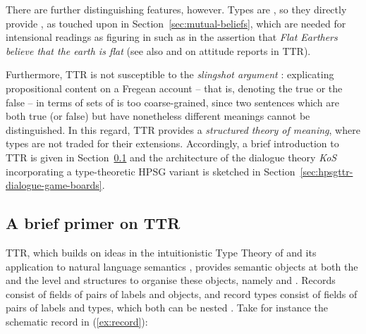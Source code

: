 \documentclass[output=paper
 	        ,biblatex
                ,babelshorthands
                ,newtxmath
                ,draftmode
                ,colorlinks, citecolor=brown
]{langscibook}
\begin{document}
There are further distinguishing features, however.
%
Types are , so they directly provide , as touched upon in Section~\ref{sec:mutual-beliefs}, which are needed for intensional readings as figuring in  such as in the assertion that \textit{Flat Earthers believe that the earth is flat} (see also \citealt{Cooper:2005:b} and \citealt{Cooper:ms} on attitude reports in TTR).


Furthermore, TTR is not susceptible to the \emph{slingshot argument}  \citep[--26]{Barwise:Perry:1983}: explicating propositional content on a Fregean account \citep{Frege:1892} -- that is, denoting the true or the false -- in terms of sets of  is too coarse-grained, since two sentences which are both true (or false) but have nonetheless different meanings cannot be distinguished.
%
In this regard, TTR provides a \emph{structured theory of meaning},  where types are not traded for their extensions.
%
Accordingly, a brief introduction to TTR is given in Section~\ref{sec:brief-primer-ttr} and the architecture of the dialogue theory \emph{KoS} incorporating a type-theoretic HPSG variant is sketched in Section~\ref{sec:hpsgttr-dialogue-game-boards}.
  




  
\subsection{A brief primer on TTR}
\label{sec:brief-primer-ttr}

TTR, which builds on ideas in the intuitionistic Type Theory of \citet{Martin-Loef:1984} and its application to natural language semantics \citep[see][]{Ranta:2015}, provides semantic objects at both the  and the  level and structures to organise these objects, namely  and  %
\citetext{see \citealp{Cooper:2005:a}, \citealp{Cooper:2005:b}, \citealp{Cooper:2012}, \citealp{Cooper:2017:a}, and \citealp{Cooper:Ginzburg:2015} for expositions}. 
%
Records consist of fields of pairs of labels and objects, and record types consist of fields of pairs of labels and types, which both can be nested \citep{Cooper:ms}.
%
%
Take for instance the schematic record in (\ref{ex:record}):
%
\ea \label{ex:record}
\avm{
[$l_0$ & = [$l_1$ & = $o_1$ \\
			$l_2$ & = $o_2$] \\
$l_3$ & = $o_3$]
}
\z
\end{document}
